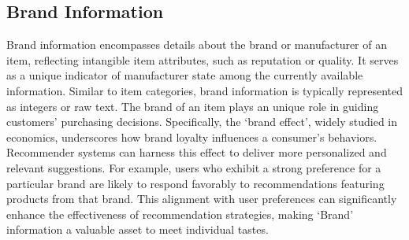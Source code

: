 \documentclass[lettersize,journal]{IEEEtran}
\begin{document}

\subsection{Brand Information}
Brand information encompasses details about the brand or manufacturer of an item, reflecting intangible item attributes, such as reputation or quality. It serves as a unique indicator of manufacturer state among the currently available information. Similar to item categories, brand information is typically represented as integers or raw text. The brand of an item plays an unique role in guiding customers' purchasing decisions. Specifically, the `brand effect', widely studied in economics, underscores how brand loyalty influences a consumer's behaviors. Recommender systems can harness this effect to deliver more personalized and relevant suggestions. For example, users who exhibit a strong preference for a particular brand are likely to respond favorably to recommendations featuring products from that brand. This alignment with user preferences can significantly enhance the effectiveness of recommendation strategies, making `Brand' information a valuable asset to meet individual tastes. 

\end{document}
